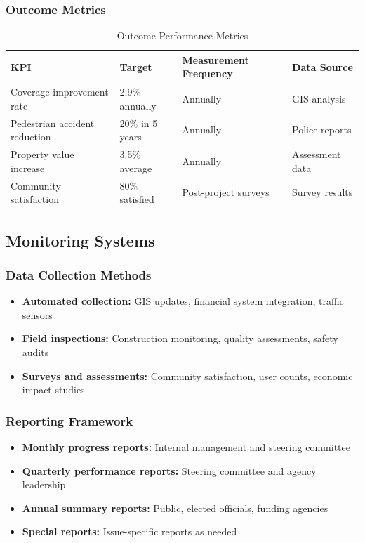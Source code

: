 \documentclass[11pt,letterpaper]{article}
\begin{document}
\subsubsection{Outcome Metrics}
\begin{table}[h]
\centering
\caption{Outcome Performance Metrics}
\begin{tabular}{llll}
\toprule
\textbf{KPI} & \textbf{Target} & \textbf{Measurement Frequency} & \textbf{Data Source} \\
\midrule
Coverage improvement rate & 2.9\% annually & Annually & GIS analysis \\
Pedestrian accident reduction & 20\% in 5 years & Annually & Police reports \\
Property value increase & 3.5\% average & Annually & Assessment data \\
Community satisfaction & 80\% satisfied & Post-project surveys & Survey results \\
\bottomrule
\end{tabular}
\end{table}

\subsection{Monitoring Systems}

\subsubsection{Data Collection Methods}
\begin{itemize}
    \item \textbf{Automated collection:} GIS updates, financial system integration, traffic sensors
    \item \textbf{Field inspections:} Construction monitoring, quality assessments, safety audits
    \item \textbf{Surveys and assessments:} Community satisfaction, user counts, economic impact studies
\end{itemize}

\subsubsection{Reporting Framework}
\begin{itemize}
    \item \textbf{Monthly progress reports:} Internal management and steering committee
    \item \textbf{Quarterly performance reports:} Steering committee and agency leadership
    \item \textbf{Annual summary reports:} Public, elected officials, funding agencies
    \item \textbf{Special reports:} Issue-specific reports as needed
\end{itemize}
\end{document}
